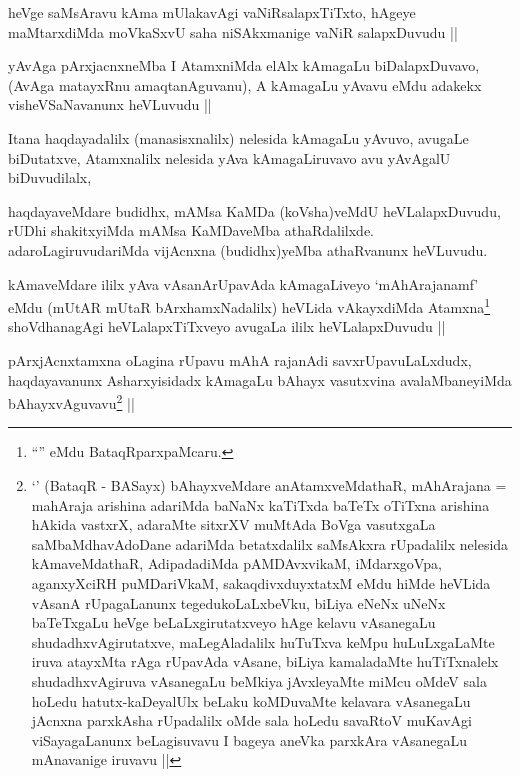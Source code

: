 \begin{artha}
heVge saMsAravu kAma mUlakavAgi vaNiRsalapxTiTxto, hAgeye maMtarxdiMda
moVkaSxvU saha niSAkxmanige vaNiR salapxDuvudu ||
\end{artha}


\begin{artha}
yAvAga pArxjacnxneMba I AtamxniMda elAlx kAmagaLu biDalapxDuvavo,
(AvAga matayxRnu amaqtanAguvanu), A kAmagaLu yAvavu eMdu adakekx
visheVSaNavanunx heVLuvudu || 
\end{artha}


\begin{artha}
Itana haqdayadalilx (manasisxnalilx) nelesida kAmagaLu yAvuvo, avugaLe
biDutatxve, Atamxnalilx nelesida yAva kAmagaLiruvavo avu yAvAgalU
biDuvudilalx, 
\end{artha}

\begin{artha}
haqdayaveMdare budidhx, mAMsa KaMDa (koVsha)veMdU heVLalapxDuvudu,
rUDhi shakitxyiMda mAMsa KaMDaveMba
athaRdalilxde. adaroLagiruvudariMda vijAcnxna (budidhx)yeMba
athaRvanunx heVLuvudu.
\end{artha}


\begin{artha}
kAmaveMdare ililx yAva vAsanArUpavAda kAmagaLiveyo `mAhArajanamf' eMdu
(mUtAR mUtaR bArxhamxNadalilx) heVLida vAkayxdiMda
Atamxna\footnote{``\stext'' eMdu BataqRparxpaMcaru.}
shoVdhanagAgi heVLalapxTiTxveyo avugaLa ililx heVLalapxDuvudu ||
\end{artha}


\begin{artha}
pArxjAcnxtamxna oLagina rUpavu mAhA rajanAdi savxrUpavuLaLxdudx,
haqdayavanunx Asharxyisidadx kAmagaLu bAhayx vasutxvina
avalaMbaneyiMda bAhayxvAguvavu\footnote{`\stext' (BataqR - BASayx)
  bAhayxveMdare anAtamxveMdathaR, mAhArajana = mahAraja arishina
  adariMda baNaNx kaTiTxda baTeTx oTiTxna arishina hAkida vastxrX,
  adaraMte sitxrXV muMtAda BoVga vasutxgaLa saMbaMdhavAdoDane adariMda
  betatxdalilx saMsAkxra rUpadalilx nelesida kAmaveMdathaR,
  AdipadadiMda pAMDAvxvikaM, iMdarxgoVpa, aganxyXciRH puMDariVkaM,
  sakaqdivxduyxtatxM eMdu hiMde heVLida vAsanA rUpagaLanunx
  tegedukoLaLxbeVku, biLiya eNeNx uNeNx baTeTxgaLu heVge
  beLaLxgirutatxveyo hAge kelavu vAsanegaLu shudadhxvAgirutatxve,
  maLegAladalilx huTuTxva keMpu huLuLxgaLaMte iruva atayxMta rAga
  rUpavAda vAsane, biLiya kamaladaMte huTiTxnalelx shudadhxvAgiruva
  vAsanegaLu beMkiya jAvxleyaMte miMcu oMdeV sala hoLedu
  hatutx-kaDeyalUlx beLaku koMDuvaMte kelavara vAsanegaLu jAcnxna
  parxkAsha rUpadalilx oMde sala hoLedu savaRtoV muKavAgi
  viSayagaLanunx beLagisuvavu I bageya aneVka parxkAra vAsanegaLu
  mAnavanige iruvavu ||} ||
\end{artha}

